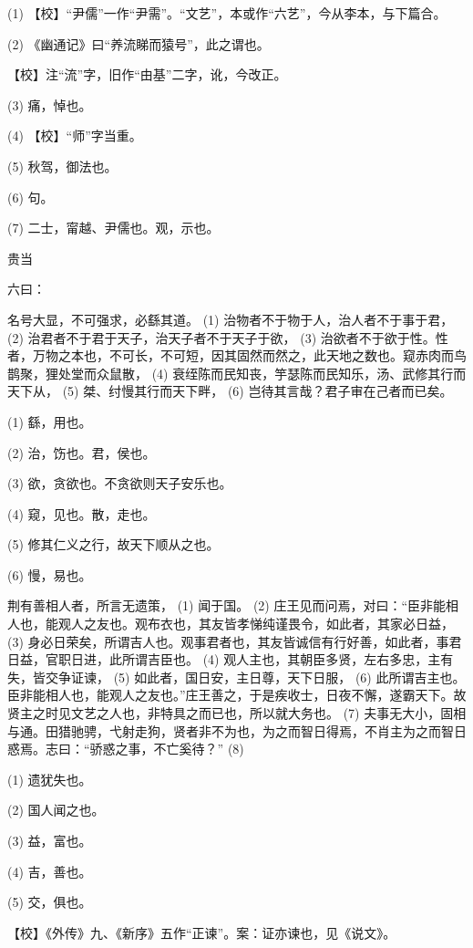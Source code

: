 \documentclass[12pt,UTF8]{ctexbook}
\begin{document}
(1) 【校】“尹儒”一作“尹需”。“文艺”，本或作“六艺”，今从李本，与下篇合。

(2) 《幽通记》曰“养流睇而猿号”，此之谓也。

【校】注“流”字，旧作“由基”二字，讹，今改正。

(3) 痛，悼也。

(4) 【校】“师”字当重。

(5) 秋驾，御法也。

(6) 句。

(7) 二士，甯越、尹儒也。观，示也。





贵当


六曰：

名号大显，不可强求，必繇其道。 (1) 治物者不于物于人，治人者不于事于君， (2) 治君者不于君于天子，治天子者不于天子于欲， (3) 治欲者不于欲于性。性者，万物之本也，不可长，不可短，因其固然而然之，此天地之数也。窥赤肉而鸟鹊聚，狸处堂而众鼠散， (4) 衰绖陈而民知丧，竽瑟陈而民知乐，汤、武修其行而天下从， (5) 桀、纣慢其行而天下畔， (6) 岂待其言哉？君子审在己者而已矣。

(1) 繇，用也。

(2) 治，饬也。君，侯也。

(3) 欲，贪欲也。不贪欲则天子安乐也。

(4) 窥，见也。散，走也。

(5) 修其仁义之行，故天下顺从之也。

(6) 慢，易也。

荆有善相人者，所言无遗策， (1) 闻于国。 (2) 庄王见而问焉，对曰：“臣非能相人也，能观人之友也。观布衣也，其友皆孝悌纯谨畏令，如此者，其家必日益， (3) 身必日荣矣，所谓吉人也。观事君者也，其友皆诚信有行好善，如此者，事君日益，官职日进，此所谓吉臣也。 (4) 观人主也，其朝臣多贤，左右多忠，主有失，皆交争证谏， (5) 如此者，国日安，主日尊，天下日服， (6) 此所谓吉主也。臣非能相人也，能观人之友也。”庄王善之，于是疾收士，日夜不懈，遂霸天下。故贤主之时见文艺之人也，非特具之而已也，所以就大务也。 (7) 夫事无大小，固相与通。田猎驰骋，弋射走狗，贤者非不为也，为之而智日得焉，不肖主为之而智日惑焉。志曰：“骄惑之事，不亡奚待？” (8)

(1) 遗犹失也。

(2) 国人闻之也。

(3) 益，富也。

(4) 吉，善也。

(5) 交，俱也。

【校】《外传》九、《新序》五作“正谏”。案：证亦谏也，见《说文》。
\end{document}
